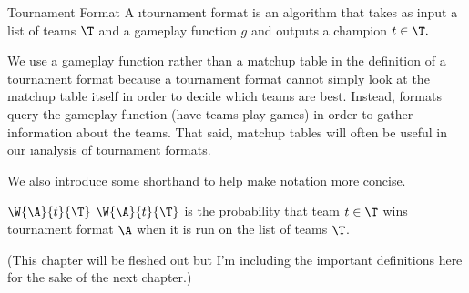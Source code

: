{

\begin{definition}{Tournament Format}{}
    A \i{tournament format} is an algorithm that takes as input a list of teams $\T$ and a gameplay function $g$ and outputs a champion $t \in \T.$
\end{definition}

We use a gameplay function rather than a matchup table in the definition of a tournament format because a tournament format cannot simply look at the matchup table itself in order to decide which teams are best. Instead, formats query the gameplay function (have teams play games) in order to gather information about the teams. That said, matchup tables will often be useful in our \i{analysis} of tournament formats. 

We also introduce some shorthand to help make notation more concise.

\begin{definition}{$\W{\A}{t}{\T}$}{}
    $\W{\A}{t}{\T}$ is the probability that team $t \in \T$ wins tournament format $\A$ when it is run on the list of teams $\T$.
\end{definition}



(This chapter will be fleshed out but I'm including the important definitions here for the sake of the next chapter.)
}







